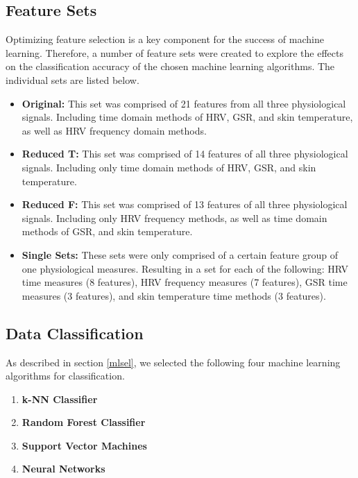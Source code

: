 \subsection{Feature Sets} 
Optimizing feature selection is a key component for the success of machine learning. Therefore, a number of feature sets were created to explore the effects on the classification accuracy of the chosen machine learning algorithms. The individual sets are listed below.
\begin{itemize}
\item \textbf{Original:} This set was comprised of 21 features from all three physiological signals. Including time domain methods of HRV, GSR, and skin temperature, as well as HRV frequency domain methods.
\item \textbf{Reduced T:} This set was comprised of 14 features of all three physiological signals. Including only time domain methods of HRV, GSR, and skin temperature.
\item \textbf{Reduced F:} This set was comprised of 13 features of all three physiological signals. Including only HRV frequency methods, as well as time domain methods of GSR, and skin temperature.
\item \textbf{Single Sets:} These sets were only comprised of a certain feature group of one physiological measures. Resulting in a set for each of the following: HRV time measures (8 features), HRV frequency measures (7 features), GSR time measures (3 features), and skin temperature time methods (3 features).
\end{itemize}

\subsection{Data Classification}
As described in section \ref{mlsel}, we selected the following four machine learning algorithms for classification.
\begin{enumerate}
\item \textbf{k-NN Classifier}
\item \textbf{Random Forest Classifier}
\item \textbf{Support Vector Machines}
\item \textbf{Neural Networks}
\end{enumerate}

